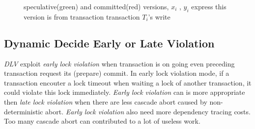 \documentclass[conference]{IEEEtran}
\begin{document}
\begin{figure}[htbp]
{  }
  \caption{speculative(green) and committed(red) versions,
  ${x_i}$ , ${y_i}$ express this version is from transaction transaction ${T_i}$'s write
}
\label{fig:versions_example}
\end{figure}

\subsection {Dynamic Decide Early or Late Violation}

\emph{DLV} exploit \emph{early lock violation}
when transaction is on going even preceding transaction request its (prepare) commit.
In early lock violation mode,
if a transaction encouter a lock timeout when waiting a lock of another transaction, 
it could violate this lock immediately.
\emph{Early lock violation} can is more appropriate then \emph{late lock violation} when there are less cascade abort caused by non-deterministic abort.
\emph{Early lock violation} also need more dependency tracing costs.
Too many cascade abort can contributed to a lot of useless work.
\end{document}
